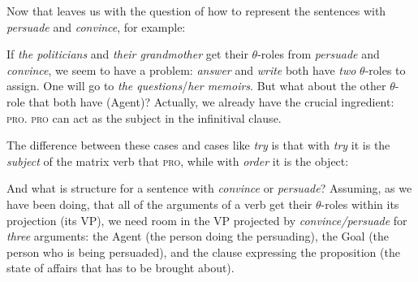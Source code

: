 \documentclass{article}
\begin{document}
Now that leaves us with the question of how to represent the sentences with \emph{persuade} and \emph{convince}, for example:
\begin{exe}
\end{exe}
If \emph{the politicians} and \emph{their grandmother} get their $\theta$-roles from \emph{persuade} and \emph{convince}, we seem to have a problem: \emph{answer} and \emph{write} both have \emph{two} $\theta$-roles to assign.
One will go to \emph{the questions}/\emph{her memoirs}.
But what about the other $\theta$-role that both have (Agent)?
Actually, we already have the crucial ingredient:  \textsc{pro}.
\textsc{pro} can act as the subject in the infinitival clause. 
\begin{exe}
\end{exe}
The difference between these cases and cases like \emph{try} is that with \emph{try} it is the \textit{subject} of the matrix verb that  \textsc{pro}, while with \emph{order} it is the object:
\begin{exe}
\end{exe}
And what is structure for a sentence with \emph{convince} or \emph{persuade}?
Assuming, as we have been doing, that all of the arguments of a verb get their $\theta$-roles within its projection (its VP), we need room in the VP projected by \emph{convince/persuade} for \emph{three} arguments: the Agent (the person doing the persuading), the Goal (the person who is being persuaded), and the clause expressing the proposition (the state of affairs that has to be brought about).
\end{document}
